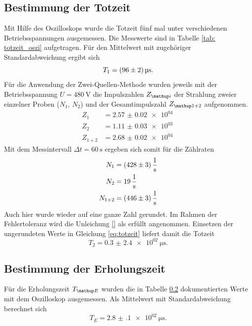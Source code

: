 \subsection{Bestimmung der Totzeit}
Mit Hilfe des Oszilloskops wurde die Totzeit fünf mal unter verschiedenen Betriebsspannungen ausgemessen. Die Messwerte
sind in Tabelle \ref{tab: totzeit_oszi} aufgetragen. Für den Mittelwert mit zugehöriger Standardabweichung ergibt sich
\begin{equation}
  T_1 = \SI{96 \pm 2}{\micro\second}.
\end{equation}
Für die Anwendung der Zwei-Quellen-Methode wurden jeweils mit der Betriebsspannung $U = \SI{480}{\volt}$ die
Impulszahlen $Z\ua{i}$ der Strahlung zweier einzelner Proben ($N_1,\, N_2$) und der Gesamtimpulszahl $Z\ua{1+2}$ aufgenommen.
\begin{align}
  Z_1 &= \SI{2.57(2)e+04}{}\\
  Z_2 &= \SI{1.11(3)e+03}{}\\
  Z_{1+2} &= \SI{2.68(2)e+04}{}
\end{align}%
Mit dem Messintervall $\Delta t = \SI{60}{\second}$ ergeben sich somit für die Zählraten
\begin{align}
  N_1 &= \SI{428 \pm 3}{\per\second}\\
  N_2 &= \SI{19(0) }{\per\second}\\
  N_{1+2} &= \SI{446 \pm 3}{\per\second}
\end{align}%
Auch hier wurde wieder auf eine ganze Zahl gerundet. Im Rahmen der Fehlertoleranz wird die Unleichung %
\eqref{} als erfüllt angenommen. Einsetzen der ungerundeten Werte in Gleichung \eqref{eq:totzeit} liefert damit die Totzeit %
\begin{equation}
  T_2 = \SI{0.3(24)e+02}{\micro\second}.
\end{equation}



\subsection{Bestimmung der Erholungszeit}
Für die Erholungszeit $T\ua{E}$ wurden die in Tabelle \ref{} dokumentierten Werte mit dem Oszilloskop ausgemessen. Als %
Mittelwert mit Standardabweichung berechnet sich
\begin{equation}
  T_E = \SI{2.8(1)e+02}{\micro\second}.
\end{equation}

